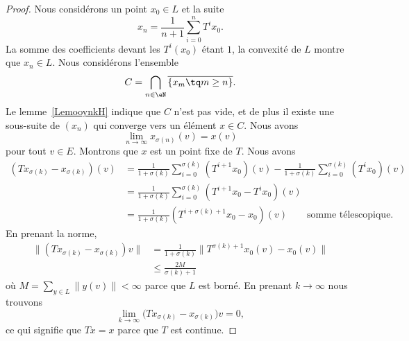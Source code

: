 \begin{proof}
	Nous considérons un point \( x_0\in L\) et la suite
	\begin{equation}
		x_n=\frac{1}{ n+1 }\sum_{i=0}^n T^ix_0.
	\end{equation}
	La somme des coefficients devant les \( T^i(x_0)\) étant \( 1\), la convexité de \( L\) montre que \( x_n\in L\). Nous considérons l'ensemble
	\begin{equation}
		C=\bigcap_{n\in \eN}\overline{ \{ x_m\tq m\geq n \} }.
	\end{equation}
	Le lemme~\ref{LemooynkH} indique que \( C\) n'est pas vide, et de plus il existe une sous-suite de \( (x_n)\) qui converge vers un élément \( x\in C\). Nous avons
	\begin{equation}
		\lim_{n\to \infty} x_{\sigma(n)}(v)=x(v)
	\end{equation}
	pour tout \( v\in E\). Montrons que \( x\) est un point fixe de \( T\). Nous avons
	\begin{subequations}
		\begin{align}
			(Tx_{\sigma(k)}-x_{\sigma(k)})(v) & =\frac{1}{ 1+\sigma(k)}\sum_{i=0}^{\sigma(k)}(T^{i+1}x_0)(v)-\frac{1}{ 1+\sigma(k)}\sum_{i=0}^{\sigma(k)}(T^ix_0)(v)                                   \\
			                                  & =\frac{1}{ 1+\sigma(k)}\sum_{i=0}^{\sigma(k)} ( T^{i+1}x_0-T^ix_0)(v)                                                                                  \\
			                                  & =\frac{1}{ 1+\sigma(k)} (T^{i+\sigma(k)+1}x_0-x_0)(v)                                                                \qquad \text{somme télescopique}.
		\end{align}
	\end{subequations}
	En prenant la norme,
	\begin{subequations}
		\begin{align}
			\| (Tx_{\sigma(k)}-x_{\sigma(k)})v \| & =\frac{1}{ 1+\sigma(k) }\big\| T^{\sigma(k)+1}x_0(v)-x_0(v) \big\| \\
			                                      & \leq\frac{ 2M }{ \sigma(k)+1 }
		\end{align}
	\end{subequations}
	où \( M=\sum_{y\in L}\| y(v) \|<\infty\) parce que \( L\) est borné. En prenant \( k\to\infty\) nous trouvons
	\begin{equation}
		\lim_{k\to \infty} \big( Tx_{\sigma(k)}-x_{\sigma(k)} \big)v=0,
	\end{equation}
	ce qui signifie que \( Tx=x\) parce que \( T\) est continue.
\end{proof}





